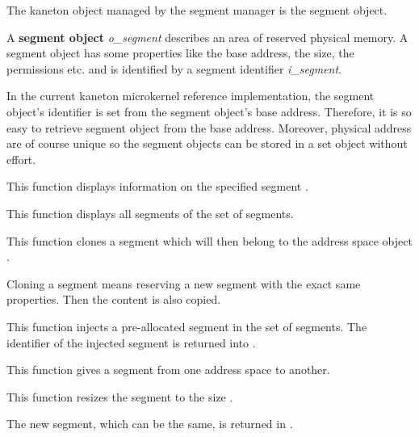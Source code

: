 The kaneton object managed by the segment manager is the segment object.

A \textbf{segment object} \textit{o\_segment} describes an area of reserved
physical memory. A segment object has some properties like the base
address, the size, the permissions etc. and is identified by a
segment identifier \textit{i\_segment}.

In the current kaneton microkernel reference implementation, the
segment object's identifier is set from the segment object's base
address. Therefore, it is so easy to retrieve segment object from
the base address. Moreover, physical address are of course unique
so the segment objects can be stored in a set object without effort.


	 {
	   This function displays information on the specified segment
	   .
	 }

	 {
	   This function displays all segments of the set of segments.
	 }

	 {
	   This function clones a segment which will then belong to
	   the address space object .

	   Cloning a segment means reserving a new segment with the
	   exact same properties. Then the content is also copied.
	 }

	 {
	   This function injects a pre-allocated segment in the set of
	   segments. The identifier of the injected segment is returned into
	   .
	 }

	 {
	   This function gives a segment from one address space to another.
	 }

	 {
	   This function resizes the segment  to the
	   size .

	   The new segment, which can be the same, is returned in
	   .

	 }

